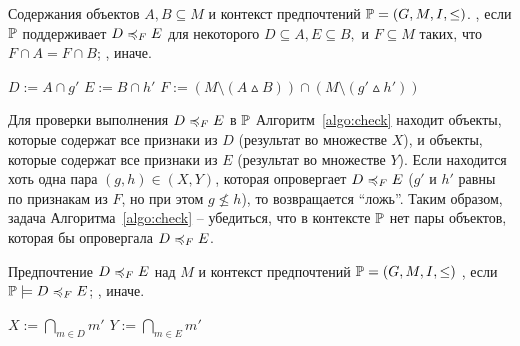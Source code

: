 		\begin{algorithm}
			\caption{$(A, B, \PP)$ \cite[Алг.~1]{Obiedkov:2013}}
			\label{algo:prediction}
			\begin{algorithmic}[1]
				\REQUIRE Содержания объектов $A, B \subseteq M$ и контекст предпочтений $\mathbb{P} = (G, M, I, \leq)$.
				\ENSURE \TRUE, если $\mathbb{P}$ поддерживает $D \preccurlyeq_{F} E$ для некоторого $D \subseteq A, E \subseteq B,$ и $F \subseteq M$ таких, что $F \cap A = F \cap B$; \FALSE, иначе.
				\item[]
				\STATE $D := A \cap g'$
				\STATE $E := B \cap h'$
				\STATE $F := (M \setminus (A \vartriangle B)) \cap (M \setminus (g' \vartriangle h'))$
				\IF{$\PP \models \DEF$}
				\RETURN \TRUE
				\ENDIF
				\ENDFOR
				\ENDFOR
				\RETURN \FALSE
			\end{algorithmic}
		\end{algorithm}
		
		Для проверки выполнения $D \preccurlyeq_{F} E$ в $\mathbb{P}$ Алгоритм~\ref{algo:check} находит объекты, которые содержат все признаки из $D$ (результат во множестве $X$), и объекты, которые содержат все признаки из $E$ (результат во множестве $Y$). Если находится хоть одна пара $(g,h) \in (X, Y)$, которая опровергает $D \preccurlyeq_{F} E$ ($g'$ и $h'$ равны по признакам из $F$, но при этом $g \nleq h$), то возвращается ``ложь''. Таким образом, задача Алгоритма~\ref{algo:check} – убедиться, что в контексте $\mathbb{P}$ нет пары объектов, которая бы опровергала $D \preccurlyeq_{F} E$. 
	
	
		\begin{algorithm}
			\caption{$(\DEF, \PP)$ \cite[Алг.~2]{Obiedkov:2013}}
			\label{algo:check}
			\begin{algorithmic}[1]
				\REQUIRE Предпочтение $D \preccurlyeq_{F} E$ над $M$ и контекст предпочтений $\mathbb{P} = (G, M, I, \leq)$
				\ENSURE \TRUE, если $\PP \models \DEF$; \FALSE, иначе.
				\item[]
				\STATE $X := \bigcap_{m \in D}m'$
				\STATE $Y := \bigcap_{m \in E}m'$
				\FORALL{$g \in X$}
				\FORALL{$h \in Y$}
				\IF {$g \not\leq h$ and $g' \cap {F} = h' \cap {F}$}
				\RETURN \FALSE
				\ENDIF
				\ENDFOR
				\ENDFOR
				\RETURN \TRUE
			\end{algorithmic}
		\end{algorithm}
		